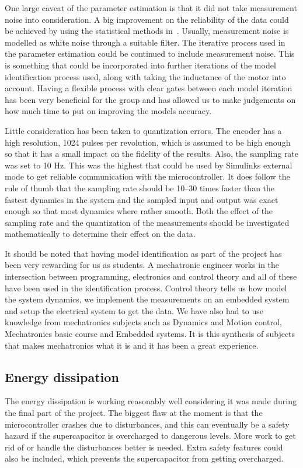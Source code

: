 One large caveat of the parameter estimation is that it did not take measurement
noise into consideration. A big improvement on the reliability of the data could
be achieved by using the statistical methods in~\cite{modeling1994}. Usually,
measurement noise is modelled as white noise through a suitable filter. The
iterative process used in the parameter estimation could be continued to include
measurement noise. This is something that could be incorporated into further
iterations of the model identification process used, along with taking the
inductance of the motor into account. Having a flexible process with clear gates
between each model iteration has been very beneficial for the group and has
allowed us to make judgements on how much time to put on improving the models
accuracy.

Little consideration has been taken to quantization errors. The
encoder has a high resolution, 1024 pulses per revolution, which is assumed to
be high enough so that it has a small impact on the fidelity of the results.
Also, the sampling rate was set to 10 Hz. This was the highest that could be
used by Simulinks external mode to get reliable communication with the
microcontroller. It does follow the rule of thumb that the sampling rate should
be 10--30 times faster than the fastest dynamics in the system and the sampled
input and output was exact enough so that most dynamics where rather smooth.
Both the effect of the sampling rate and the quantization of the measurements
should be investigated mathematically to determine their effect on the data.

It should be noted that having model identification as part of the project has
been very rewarding for us as students. A mechatronic engineer works in the
intersection between programming, electronics and control theory and all of
these have been used in the identification process. Control theory tells us how
model the system dynamics, we implement the measurements on an embedded system
and setup the electrical system to get the data. We have also had to use
knowledge from mechatronics subjects such as Dynamics and Motion control,
Mechatronics basic course and Embedded systems. It is this synthesis of subjects
that makes mechatronics what it is and it has been a great experience. 

\subsection{Energy dissipation}
The energy dissipation is working reasonably well considering it was made during the final part of the project. The biggest flaw at the moment is that the microcontroller crashes due to disturbances, and this can eventually be a safety hazard if the supercapacitor is overcharged to dangerous levels. More work to get rid of or handle the disturbances better is needed. Extra safety features could also be included, which prevents the supercapacitor from getting overcharged. 

